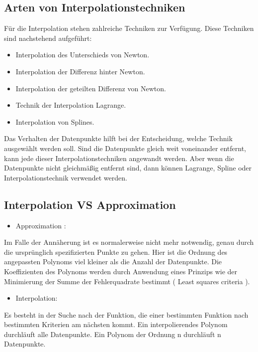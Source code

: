 {		
		
		\subsection{Arten von Interpolationstechniken}
		\begin{frame}
			
			Für die Interpolation stehen zahlreiche Techniken zur Verfügung. Diese Techniken sind nachstehend aufgeführt:
			\begin{itemize}
				\item Interpolation des Unterschieds von Newton.
				\item Interpolation der Differenz hinter Newton.
				\item Interpolation der geteilten Differenz von Newton.
				\item Technik der Interpolation Lagrange.
				\item Interpolation von Splines.
			\end{itemize}
		\end{frame}
		\noindent Das Verhalten der Datenpunkte hilft bei der Entscheidung, welche Technik ausgewählt werden soll. Sind die Datenpunkte gleich weit voneinander entfernt, kann jede dieser Interpolationstechniken angewandt werden. Aber wenn die Datenpunkte nicht gleichmäßig entfernt sind, dann können Lagrange, Spline oder Interpolationstechnik verwendet werden.
		
		
		\subsection{Interpolation VS Approximation}
		\begin{frame}
			
			\begin{itemize}
				\item Approximation :
			\end{itemize}
			
			Im Falle der Annäherung ist es normalerweise nicht mehr notwendig, genau durch die ursprünglich spezifizierten Punkte zu gehen. Hier ist die Ordnung des angepassten Polynoms viel kleiner als die Anzahl der Datenpunkte. 
			Die Koeffizienten des Polynoms werden durch Anwendung eines Prinzips wie der Minimierung der Summe der Fehlerquadrate bestimmt ( Least squares criteria ).
			
			\begin{itemize}
				\item Interpolation:
			\end{itemize}
			Es besteht in der Suche nach der Funktion, die einer bestimmten Funktion nach bestimmten Kriterien am nächsten kommt.
			Ein interpolierendes Polynom durchläuft alle Datenpunkte. Ein Polynom der Ordnung n durchläuft n Datenpunkte.
			

\end{frame}}
